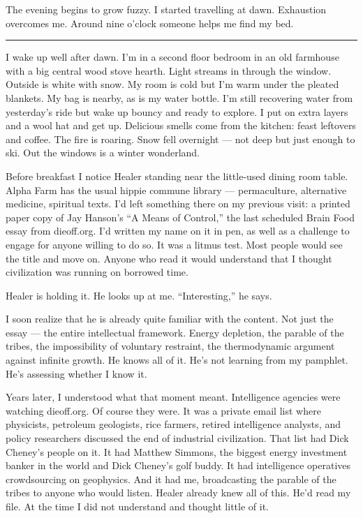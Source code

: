 The evening begins to grow fuzzy. I started travelling at dawn. Exhaustion overcomes me. Around nine o'clock someone helps me find my bed.

\vspace{1cm}\noindent\rule{0.5\textwidth}{0.5pt}\vspace{0.5cm}

I wake up well after dawn. I'm in a second floor bedroom in an old farmhouse with a big central wood stove hearth. Light streams in through the window. Outside is white with snow. My room is cold but I'm warm under the pleated blankets. My bag is nearby, as is my water bottle. I'm still recovering water from yesterday's ride but wake up bouncy and ready to explore. I put on extra layers and a wool hat and get up. Delicious smells come from the kitchen: feast leftovers and coffee. The fire is roaring. Snow fell overnight --- not deep but just enough to ski. Out the windows is a winter wonderland.

Before breakfast I notice Healer standing near the little-used dining room table. Alpha Farm has the usual hippie commune library --- permaculture, alternative medicine, spiritual texts. I'd left something there on my previous visit: a printed paper copy of Jay Hanson's ``A Means of Control,'' the last scheduled Brain Food essay from dieoff.org. I'd written my name on it in pen, as well as a challenge to engage for anyone willing to do so. It was a litmus test. Most people would see the title and move on. Anyone who read it would understand that I thought civilization was running on borrowed time.

Healer is holding it. He looks up at me. ``Interesting,'' he says.

I soon realize that he is already quite familiar with the content. Not just the essay --- the entire intellectual framework. Energy depletion, the parable of the tribes, the impossibility of voluntary restraint, the thermodynamic argument against infinite growth. He knows all of it. He's not learning from my pamphlet. He's assessing whether I know it.

Years later, I understood what that moment meant. Intelligence agencies were watching dieoff.org. Of course they were. It was a private email list where physicists, petroleum geologists, rice farmers, retired intelligence analysts, and policy researchers discussed the end of industrial civilization. That list had Dick Cheney's people on it. It had Matthew Simmons, the biggest energy investment banker in the world and Dick Cheney's golf buddy. It had intelligence operatives crowdsourcing on geophysics. And it had me, broadcasting the parable of the tribes to anyone who would listen. Healer already knew all of this. He'd read my file.  At the time I did not understand and thought little of it.

